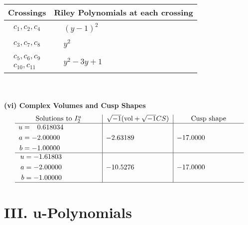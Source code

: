 \documentclass[1p]{elsarticle_modified}
\theoremstyle{definition}
\newcommand{\I}{\sqrt{-1}}
\begin{document}
\begin{tabular}{m{50pt}|m{274pt}}
Crossings & \hspace{64pt}Riley Polynomials at each crossing \\
\hline $$\begin{aligned}c_{1},c_{2},c_{4}\end{aligned}$$&$\begin{aligned}
&(y-1)^2
\end{aligned}$\\
\hline $$\begin{aligned}c_{3},c_{7},c_{8}\end{aligned}$$&$\begin{aligned}
&y^2
\end{aligned}$\\
\hline $$\begin{aligned}c_{5},c_{6},c_{9}\\c_{10},c_{11}\end{aligned}$$&$\begin{aligned}
&y^2-3 y+1
\end{aligned}$\\
\hline
\end{tabular}\\~\\
\newpage\flushleft \textbf{(vi) Complex Volumes and Cusp Shapes}
$$\begin{array}{c|c|c}  
\text{Solutions to }I^u_{2}& \I (\text{vol} + \sqrt{-1}CS) & \text{Cusp shape}\\
 \hline 
\begin{aligned}
u &= \phantom{-}0.618034\phantom{ +0.000000I} \\
a &= -2.00000\phantom{ +0.000000I} \\
b &= -1.00000\phantom{ +0.000000I}\end{aligned}
 & -2.63189\phantom{ +0.000000I} & -17.0000\phantom{ +0.000000I} \\ \hline\begin{aligned}
u &= -1.61803\phantom{ +0.000000I} \\
a &= -2.00000\phantom{ +0.000000I} \\
b &= -1.00000\phantom{ +0.000000I}\end{aligned}
 & -10.5276\phantom{ +0.000000I} & -17.0000\phantom{ +0.000000I}\\
 \hline 
 \end{array}$$\newpage
\newpage\renewcommand{\arraystretch}{1}
\centering \section*{ III. u-Polynomials}
\end{document}
